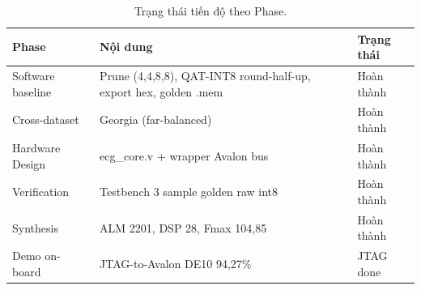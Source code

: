 \documentclass[12pt,a4paper]{article}
\begin{document}
\begin{table}[h]
\centering
\caption{Trạng thái tiến độ theo Phase.}
\begin{tabularx}{\textwidth}{lXl}
\toprule
\textbf{Phase} & \textbf{Nội dung} & \textbf{Trạng thái}\\
\midrule
Software baseline & Prune (4,4,8,8), QAT-INT8 round-half-up, export hex, golden .mem & Hoàn thành\\
Cross-dataset & Georgia (far-balanced) & Hoàn thành\\
Hardware Design & ecg\_core.v + wrapper Avalon bus & Hoàn thành\\
Verification & Testbench 3 sample golden raw int8 & Hoàn thành\\
Synthesis & ALM 2201, DSP 28, Fmax 104,85 & Hoàn thành\\
Demo on-board & JTAG-to-Avalon DE10 94,27\% & JTAG done\\
\bottomrule
\end{tabularx}
\end{table}
\end{document}
